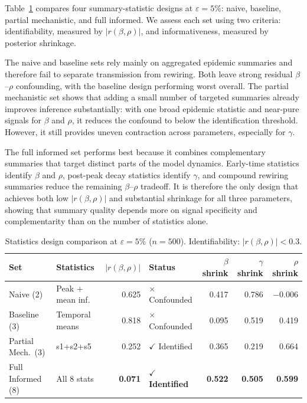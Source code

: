 \documentclass[12pt]{article}
\begin{document}
Table~\ref{tab:setcomp} compares four summary-statistic designs at $\varepsilon=5\%$: naive, baseline, partial mechanistic, and full informed. We assess each set using two criteria: identifiability, measured by $|r(\beta,\rho)|$, and informativeness, measured by posterior shrinkage.

The naive and baseline sets rely mainly on aggregated epidemic summaries and therefore fail to separate transmission from rewiring. Both leave strong residual $\beta$--$\rho$ confounding, with the baseline design performing worst overall. The partial mechanistic set shows that adding a small number of targeted summaries already improves inference substantially: with one broad epidemic statistic and near-pure signals for $\beta$ and $\rho$, it reduces the confound to below the identification threshold. However, it still provides uneven contraction across parameters, especially for $\gamma$.

The full informed set performs best because it combines complementary summaries that target distinct parts of the model dynamics. Early-time statistics identify $\beta$ and $\rho$, post-peak decay statistics identify $\gamma$, and compound rewiring summaries reduce the remaining $\beta$--$\rho$ tradeoff. It is therefore the only design that achieves both low $|r(\beta,\rho)|$ and substantial shrinkage for all three parameters, showing that summary quality depends more on signal specificity and complementarity than on the number of statistics alone.

\begin{table}[h]
\centering
\small
\begin{tabular}{lp{2.8cm}rp{2.4cm}rrr}
\toprule
\textbf{Set} & \textbf{Statistics} & $|r(\beta,\rho)|$ & \textbf{Status} & $\beta$ shrink & $\gamma$ shrink & $\rho$ shrink \\
\midrule
Naive (2)         & Peak + mean inf.   & 0.625 & $\times$ Confounded      & 0.417 & 0.786 & $-0.006$ \\
Baseline (3)      & Temporal means     & 0.818 & $\times$ Confounded      & 0.095 & 0.519 & 0.419 \\
Partial Mech.\ (3)& s1+s2+s5          & 0.252 & $\checkmark$ Identified  & 0.365 & 0.219 & 0.664 \\
Full Informed (8) & All 8 stats        & \textbf{0.071} & $\checkmark$ \textbf{Identified} & \textbf{0.522} & \textbf{0.505} & \textbf{0.599} \\
\bottomrule
\end{tabular}
\caption{Statistics design comparison at $\varepsilon=5\%$ ($n=500$). Identifiability: $|r(\beta,\rho)| < 0.3$.}
\label{tab:setcomp}
\end{table}
\end{document}

